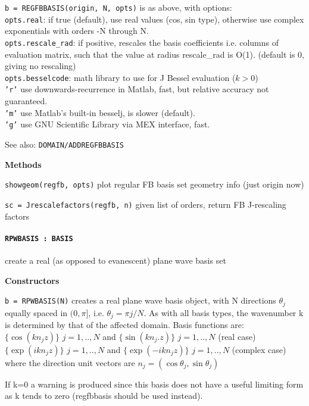   {\tt b = REGFBBASIS(origin, N, opts)} is as above, with options:\\
   {\tt opts.real}: if true (default), use real values (cos, sin
   type), otherwise use complex exponentials with orders -N through N.\\
  {\tt opts.rescale\_rad}: if positive, rescales the basis coefficients i.e.
              columns of evaluation matrix, such that the value at radius
              rescale\_rad is O(1). (default is 0, giving no rescaling)\\
   {\tt opts.besselcode}: math library to use for J Bessel evaluation ($k>0$)\\
              {\tt 'r'} use downwards-recurrence in Matlab, fast, but
                       relative accuracy not guaranteed.\\
              {\tt 'm'} use Matlab's built-in besselj, is slower (default).\\
              {\tt 'g'} use GNU Scientific Library via MEX interface, fast.

See also: {\tt DOMAIN/ADDREGFBBASIS}

\textbf{Methods}

{\tt showgeom(regfb, opts)} plot regular FB basis set geometry info
(just origin now)

{\tt sc = Jrescalefactors(regfb, n)} given list of orders, return FB
J-rescaling factors

\newpage

\paragraph{\tt RPWBASIS : BASIS} create a real (as opposed to evanescent)
plane wave basis set

\textbf{Constructors}

{\tt b = RPWBASIS(N)} creates a real plane wave basis object, with N directions
   $\theta_j$ equally spaced in $(0,\pi]$, i.e. $\theta_j = \pi j/N$. As with all basis
   types, the wavenumber k is determined by that of the affected domain.
   Basis functions are:\\
      $\{\cos(k n_j z)\}$ $j=1,..,N$ and $\{\sin(k n_j.z)\}$ $j=1,..,N$       (real case)\\
   $\{\exp(i k n_j z)\}$ $j=1,..,N$ and $\{\exp(-i k n_j z)\}$ $j=1,..,N$  (complex case)\\
     where the direction unit vectors are $n_j = (\cos\theta_j, \sin\theta_j)$

   If k=0 a warning is produced since this basis does not have a useful
   limiting form as k tends to zero (regfbbasis should be used instead).

